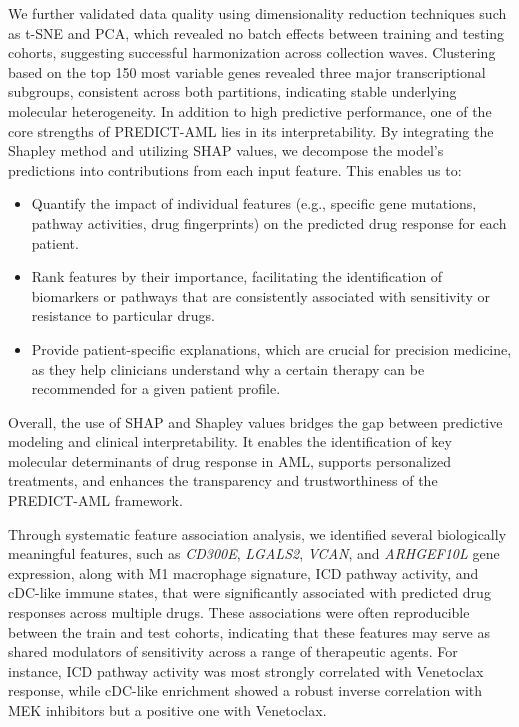 \documentclass[pdflatex,sn-mathphys-num]{sn-jnl}%
\theoremstyle{thmstyleone}%
\theoremstyle{thmstyletwo}%
\theoremstyle{thmstylethree}%
\begin{document}
We further validated data quality using dimensionality reduction techniques such as t-SNE and PCA, which revealed no batch effects between training and testing cohorts, suggesting successful harmonization across collection waves. 
Clustering based on the top 150 most variable genes revealed three major transcriptional subgroups, consistent across both partitions, indicating stable underlying molecular heterogeneity. 
In addition to high predictive performance, one of the core strengths of PREDICT-AML lies in its interpretability. By integrating the Shapley method \cite{shapley1953stochastic} and utilizing SHAP values, we decompose the model’s predictions into contributions from each input feature. 
This enables us to:
\begin{itemize}
    \item Quantify the impact of individual features (e.g., specific gene mutations, pathway activities, drug fingerprints) on the predicted drug response for each patient.
    \item Rank features by their importance, facilitating the identification of biomarkers or pathways that are consistently associated with sensitivity or resistance to particular drugs.
    \item Provide patient-specific explanations, which are crucial for precision medicine, as they help clinicians understand why a certain therapy can be recommended for a given patient profile.
\end{itemize}
Overall, the use of SHAP and Shapley values bridges the gap between predictive modeling and clinical interpretability. It enables the identification of key molecular determinants of drug response in AML, supports personalized treatments, and enhances the transparency and trustworthiness of the PREDICT-AML framework.

Through systematic feature association analysis, we identified several biologically meaningful features, such as \textit{CD300E}, \textit{LGALS2}, \textit{VCAN}, and \textit{ARHGEF10L} gene expression, along with M1 macrophage signature, ICD pathway activity, and cDC-like immune states, that were significantly associated with predicted drug responses across multiple drugs. 
These associations were often reproducible between the train and test cohorts, indicating that these features may serve as shared modulators of sensitivity across a range of therapeutic agents. 
For instance, ICD pathway activity was most strongly correlated with Venetoclax response, while cDC-like enrichment showed a robust inverse correlation with MEK inhibitors but a positive one with Venetoclax.
\end{document}
